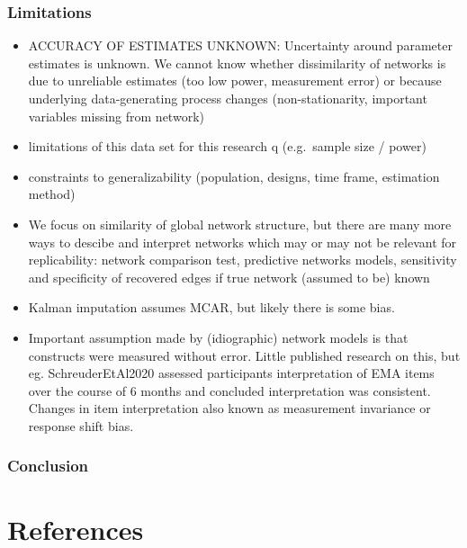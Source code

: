 \documentclass[
  english,
  man]{apa6}
\providecommand{\tightlist}{%
  \setlength{\itemsep}{0pt}\setlength{\parskip}{0pt}}
\begin{document}
\hypertarget{limitations}{%
\subsubsection{Limitations}\label{limitations}}

\begin{itemize}
\tightlist
\item
  ACCURACY OF ESTIMATES UNKNOWN: Uncertainty around parameter estimates is unknown. We cannot know whether dissimilarity of networks is due to unreliable estimates (too low power, measurement error) or because underlying data-generating process changes (non-stationarity, important variables missing from network)
\item
  limitations of this data set for this research q (e.g.~sample size / power)
\item
  constraints to generalizability (population, designs, time frame, estimation method)
\item
  We focus on similarity of global network structure, but there are many more ways to descibe and interpret networks which may or may not be relevant for replicability: network comparison test, predictive networks models, sensitivity and specificity of recovered edges if true network (assumed to be) known
\item
  Kalman imputation assumes MCAR, but likely there is some bias.
\item
  Important assumption made by (idiographic) network models is that constructs were measured without error. Little published research on this, but eg. SchreuderEtAl2020 assessed participants interpretation of EMA items over the course of 6 months and concluded interpretation was consistent. Changes in item interpretation also known as measurement invariance or response shift bias.
\end{itemize}

\hypertarget{conclusion}{%
\subsubsection{Conclusion}\label{conclusion}}

\newpage

\hypertarget{references}{%
\section{References}\label{references}}

\begingroup
\setlength{\parindent}{-0.5in}
\setlength{\leftskip}{0.5in}
\end{document}
